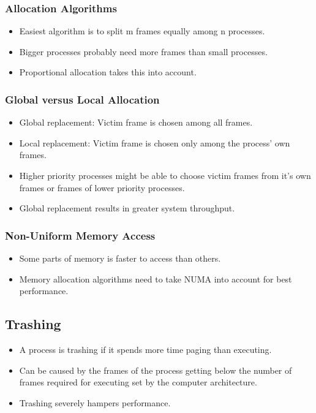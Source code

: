 \documentclass[a4wide,10pt]{article}
\begin{document}
	\subsubsection{Allocation Algorithms} %
	\label{ssub:allocation_algorithms}
	\begin{itemize}
		\item Easiest algorithm is to split m frames equally among n processes.
		\item Bigger processes probably need more frames than small processes.
		\item Proportional allocation takes this into account.
	\end{itemize}
	
	\subsubsection{Global versus Local Allocation} %
	\label{ssub:global_versus_local_allocation}
	\begin{itemize}
		\item Global replacement: Victim frame is chosen among all frames.
		\item Local replacement: Victim frame is chosen only among the process' own frames.
		\item Higher priority processes might be able to choose victim frames from it's own frames or frames of lower priority processes.
		\item Global replacement results in greater system throughput.
	\end{itemize}
	
	\subsubsection{Non-Uniform Memory Access} %
	\label{ssub:non_uniform_memory_access}
	\begin{itemize}
		\item Some parts of memory is faster to access than others.
		\item Memory allocation algorithms need to take NUMA into account for best performance.
	\end{itemize}

\subsection{Trashing} %
\label{sub:trashing}
\begin{itemize}
	\item A process is trashing if it spends more time paging than executing.
	\item Can be caused by the frames of the process getting below the number of frames required for executing set by the computer architecture.
	\item Trashing severely hampers performance.
\end{itemize}
	
\end{document}
